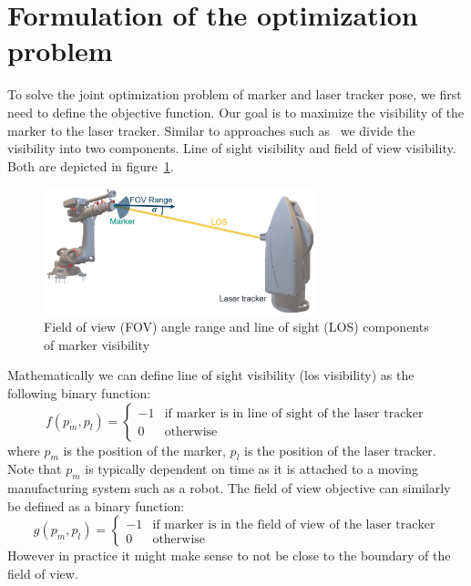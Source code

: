 \documentclass{svproc}
\begin{document}
\section{Formulation of the optimization problem}
To solve the joint optimization problem of marker and laser tracker pose, we first need to define the objective function.
Our goal is to maximize the visibility of the marker to the laser tracker.
Similar to approaches such as~\cite{ieee_sensors} we divide the visibility into two components.
Line of sight visibility and field of view visibility.
Both  are depicted in figure~\ref{fig:visibility}.
\begin{figure}
        \centering
        \includegraphics[width=0.7\textwidth]{figures/visibility.png}
        \caption{Field of view (FOV) angle range and line of sight (LOS) components of marker visibility}
        \label{fig:visibility}
\end{figure}
Mathematically we can define line of sight visibility (los visibility) as the following binary function:
\begin{equation}
    f(p_m,p_l) = \begin{cases}
    -1 & \text{if } \text{marker is in line of sight of the laser tracker} \\
    0 & \text{otherwise}
    \end{cases}
\end{equation}
where $p_m$ is the position of the marker, $p_l$ is the position of the laser tracker.
Note that $p_m$ is typically dependent on time as it is attached to a moving manufacturing system such as a robot.
The field of view objective can similarly be defined as a binary function:
\begin{equation}
    g(p_m,p_l) = \begin{cases}
    -1 & \text{if } \text{marker is in the field of view of the laser tracker} \\
    0 & \text{otherwise}
    \end{cases}
\end{equation}
However in practice it might make sense to not be close to the boundary of the field of view.
\end{document}
